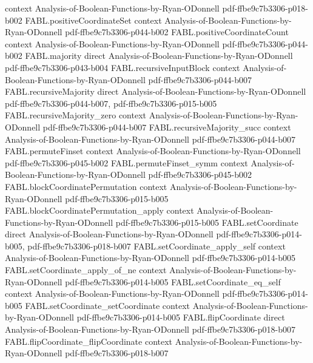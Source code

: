 \begin{theorem}
  {context}
  {Analysis-of-Boolean-Functions-by-Ryan-ODonnell}
  {pdf-ffbe9c7b3306-p018-b002}
\proofstep
  {FABL.positiveCoordinateSet}
  {context}
  {Analysis-of-Boolean-Functions-by-Ryan-ODonnell}
  {pdf-ffbe9c7b3306-p044-b002}
\proofstep
  {FABL.positiveCoordinateCount}
  {context}
  {Analysis-of-Boolean-Functions-by-Ryan-ODonnell}
  {pdf-ffbe9c7b3306-p044-b002}
\proofstep
  {FABL.majority}
  {direct}
  {Analysis-of-Boolean-Functions-by-Ryan-ODonnell}
  {pdf-ffbe9c7b3306-p043-b004}
\proofstep
  {FABL.recursiveInputBlock}
  {context}
  {Analysis-of-Boolean-Functions-by-Ryan-ODonnell}
  {pdf-ffbe9c7b3306-p044-b007}
\proofstep
  {FABL.recursiveMajority}
  {direct}
  {Analysis-of-Boolean-Functions-by-Ryan-ODonnell}
  {pdf-ffbe9c7b3306-p044-b007,
    pdf-ffbe9c7b3306-p015-b005}
\proofstep
  {FABL.recursiveMajority_zero}
  {context}
  {Analysis-of-Boolean-Functions-by-Ryan-ODonnell}
  {pdf-ffbe9c7b3306-p044-b007}
\proofstep
  {FABL.recursiveMajority_succ}
  {context}
  {Analysis-of-Boolean-Functions-by-Ryan-ODonnell}
  {pdf-ffbe9c7b3306-p044-b007}
\proofstep
  {FABL.permuteFinset}
  {context}
  {Analysis-of-Boolean-Functions-by-Ryan-ODonnell}
  {pdf-ffbe9c7b3306-p045-b002}
\proofstep
  {FABL.permuteFinset_symm}
  {context}
  {Analysis-of-Boolean-Functions-by-Ryan-ODonnell}
  {pdf-ffbe9c7b3306-p045-b002}
\proofstep
  {FABL.blockCoordinatePermutation}
  {context}
  {Analysis-of-Boolean-Functions-by-Ryan-ODonnell}
  {pdf-ffbe9c7b3306-p015-b005}
\proofstep
  {FABL.blockCoordinatePermutation_apply}
  {context}
  {Analysis-of-Boolean-Functions-by-Ryan-ODonnell}
  {pdf-ffbe9c7b3306-p015-b005}
\proofstep
  {FABL.setCoordinate}
  {direct}
  {Analysis-of-Boolean-Functions-by-Ryan-ODonnell}
  {pdf-ffbe9c7b3306-p014-b005,
    pdf-ffbe9c7b3306-p018-b007}
\proofstep
  {FABL.setCoordinate_apply_self}
  {context}
  {Analysis-of-Boolean-Functions-by-Ryan-ODonnell}
  {pdf-ffbe9c7b3306-p014-b005}
\proofstep
  {FABL.setCoordinate_apply_of_ne}
  {context}
  {Analysis-of-Boolean-Functions-by-Ryan-ODonnell}
  {pdf-ffbe9c7b3306-p014-b005}
\proofstep
  {FABL.setCoordinate_eq_self}
  {context}
  {Analysis-of-Boolean-Functions-by-Ryan-ODonnell}
  {pdf-ffbe9c7b3306-p014-b005}
\proofstep
  {FABL.setCoordinate_setCoordinate}
  {context}
  {Analysis-of-Boolean-Functions-by-Ryan-ODonnell}
  {pdf-ffbe9c7b3306-p014-b005}
\proofstep
  {FABL.flipCoordinate}
  {direct}
  {Analysis-of-Boolean-Functions-by-Ryan-ODonnell}
  {pdf-ffbe9c7b3306-p018-b007}
\proofstep
  {FABL.flipCoordinate_flipCoordinate}
  {context}
  {Analysis-of-Boolean-Functions-by-Ryan-ODonnell}
  {pdf-ffbe9c7b3306-p018-b007}
\proofstep

\end{theorem}
